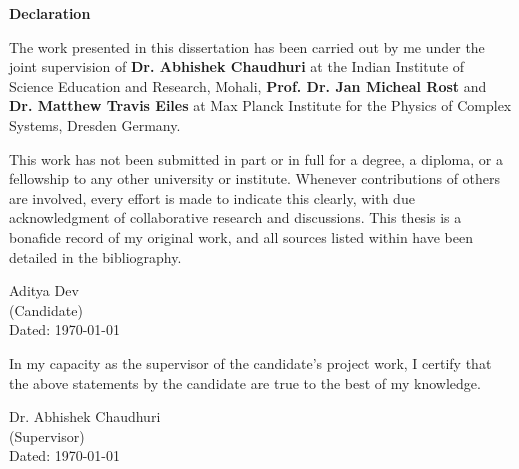 \begin{center}
    \textbf{\Large Declaration}
\end{center}
The work presented in this dissertation has been carried out by me under the joint supervision of 
\textbf{Dr. Abhishek Chaudhuri} at the Indian Institute of Science Education and Research, Mohali, 
\textbf{Prof. Dr.  Jan Micheal Rost} and \textbf{Dr. Matthew Travis Eiles} at Max Planck Institute for the Physics of Complex Systems, Dresden Germany. 

\vspace{0.4cm}

This work has not been submitted in part or in full for a degree, a diploma, or a fellowship to any other university or institute. Whenever contributions of others are involved, every effort is made to indicate this clearly, with due acknowledgment of collaborative research and discussions. This thesis is a bonafide record of my original work, and all sources listed within have been detailed in the bibliography.

\vspace{2cm}

\begin{flushright}
Aditya Dev
\\
(Candidate)
\\
Dated: \today
\end{flushright}

In my capacity as the supervisor of the candidate's project work, I certify that the above statements by the candidate are true to the best of my knowledge.

\vspace{2cm}

\begin{flushright}
Dr. Abhishek Chaudhuri
\\
(Supervisor)
\\
Dated: \today
\end{flushright}